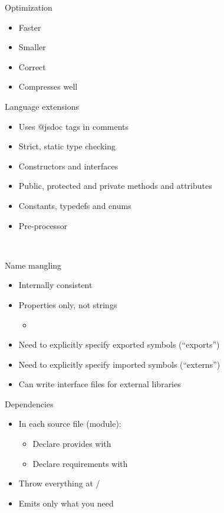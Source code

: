 \documentclass{powerdot}
\begin{document}
\begin{slide}{Optimization}
\begin{itemize}
\item Faster
\item Smaller
\item Correct
\item Compresses well
\end{itemize}
\end{slide}

\begin{slide}{Language extensions}
\begin{itemize}
\item Uses @jsdoc tags in comments
\item Strict, static type checking
\item Constructors and interfaces
\item Public, protected and private methods and attributes
\item Constants, typedefs and enums
\item Pre-processor
\end{itemize}
 \\
\end{slide}

\begin{slide}{Name mangling}
\begin{itemize}
\item Internally consistent
\item Properties only, not strings
\begin{itemize}
\item {}
\end{itemize}
\item Need to explicitly specify exported symbols (``exports'')
\item Need to explicitly specify imported symbols (``externs'')
\item Can write interface files for external libraries
\end{itemize}
\end{slide}

\begin{slide}{Dependencies}
\begin{itemize}
\item In each source file (module):
\begin{itemize}
\item Declare provides with 
\item Declare requirements with 
\end{itemize}
\item Throw everything at /
\item Emits only what you need
\end{itemize}
\end{slide}
\end{document}
